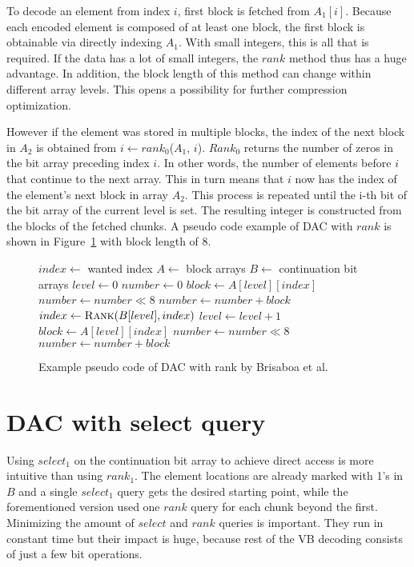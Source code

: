 To decode an element from index $i$, first block is fetched from $A_1[i]$. Because each encoded element is composed of at least one block, the first block is obtainable via directly indexing $A_1$. 
With small integers, this is all that is required. If the data has a lot of small integers, the $rank$ method thus has a huge advantage. In addition, the block length of this method can change within 
different array levels. This opens a possibility for further compression optimization.

However if the element was stored in multiple blocks, the index of the next block in $A_2$ is obtained from $i \gets rank_0$($A_1$, $i$). $Rank_0$ 
returns the number of zeros in the bit array preceding index $i$. In other words, the number of elements before $i$ that continue to the next array. 
This in turn means that $i$ now has the index of the element's next block in array $A_2$.
This process is repeated until the i-th bit of the bit array of the current level is set. The resulting integer is constructed from the blocks of the fetched chunks. A pseudo code example of DAC with $rank$ is shown in Figure~\ref{bris_pseudo} 
with block length of 8.


\begin{figure}[ht]
\centering
\begin{minipage}{0.5\linewidth}
\begin{algorithmic}
\State $index \gets $ wanted index
\State $A \gets $ block arrays
\State $B \gets $ continuation bit arrays
\State $level \gets 0$
\State $number \gets 0$
\State $block \gets A[level][index]$
\State $number \gets number \mathbin{\ll} 8$
\State $number \gets number + block$
\State $index \gets \Call{Rank}{B[level], index}$
\State $level \gets level + 1$
\EndWhile
\State $block \gets A[level][index]$
\State $number \gets number \mathbin{\ll} 8$
\State $number \gets number + block$
\end{algorithmic}
\end{minipage}
\caption{Example pseudo code of DAC with rank by Brisaboa et al.} \label{bris_pseudo}

\end{figure}

\chapter{DAC with select query}
\label{chap:select_impl}
Using $select_1$ on the continuation bit array to achieve direct access is more intuitive than using $rank_1$. The element locations are already marked with 1's 
in $B$ and a single $select_1$ query gets the desired starting point, while the forementioned version \citep{Bri09} used one $rank$ query for each chunk beyond 
the first. Minimizing the amount of $select$ and $rank$ queries is important. They run in constant time but their impact is huge, because rest of the VB decoding 
consists of just a few bit operations. 

